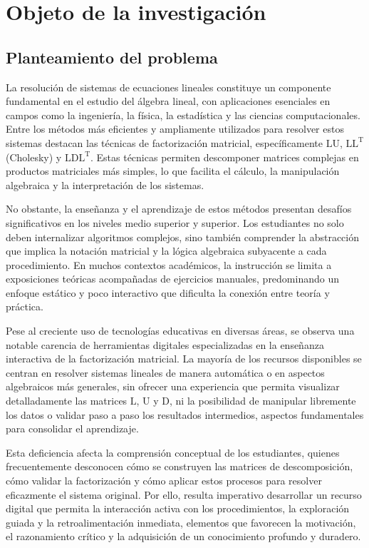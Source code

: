 \chapter{Objeto de la investigación}
\label{ObjetoInv}
 
\parskip=12pt
\section{Planteamiento del problema}\label{Seccion11}
\noindent La resolución de sistemas de ecuaciones lineales constituye un componente fundamental en el estudio del álgebra lineal, con aplicaciones esenciales en campos como la ingeniería, la física, la estadística y las ciencias computacionales. Entre los métodos más eficientes y ampliamente utilizados para resolver estos sistemas destacan las técnicas de factorización matricial, específicamente $\mathrm{LU}$, $\mathrm{LL^T}$ (Cholesky) y $\mathrm{LDL^T}$. Estas técnicas permiten descomponer matrices complejas en productos matriciales más simples, lo que facilita el cálculo, la manipulación algebraica y la interpretación de los sistemas.

\noindent No obstante, la enseñanza y el aprendizaje de estos métodos presentan desafíos significativos en los niveles medio superior y superior. Los estudiantes no solo deben internalizar algoritmos complejos, sino también comprender la abstracción que implica la notación matricial y la lógica algebraica subyacente a cada procedimiento. En muchos contextos académicos, la instrucción se limita a exposiciones teóricas acompañadas de ejercicios manuales, predominando un enfoque estático y poco interactivo que dificulta la conexión entre teoría y práctica.

Pese al creciente uso de tecnologías educativas en diversas áreas, se observa una notable carencia de herramientas digitales especializadas en la enseñanza interactiva de la factorización matricial. La mayoría de los recursos disponibles se centran en resolver sistemas lineales de manera automática o en aspectos algebraicos más generales, sin ofrecer una experiencia que permita visualizar detalladamente las matrices $\mathrm{L}$, $\mathrm{U}$ y $\mathrm{D}$, ni la posibilidad de manipular libremente los datos o validar paso a paso los resultados intermedios, aspectos fundamentales para consolidar el aprendizaje.

\parskip=15pt
\noindent Esta deficiencia afecta la comprensión conceptual de los estudiantes, quienes frecuentemente desconocen cómo se construyen las matrices de descomposición, cómo validar la factorización y cómo aplicar estos procesos para resolver eficazmente el sistema original. Por ello, resulta imperativo desarrollar un recurso digital que permita la interacción activa con los procedimientos, la exploración guiada y la retroalimentación inmediata, elementos que favorecen la motivación, el razonamiento crítico y la adquisición de un conocimiento profundo y duradero.


